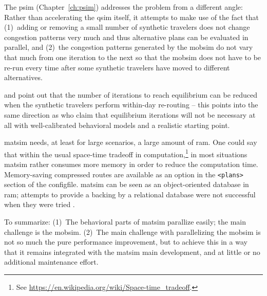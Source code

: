 The \gls{psim} (Chapter~\ref{ch:psim}) addresses the problem from a different angle: Rather than accelerating the \gls{qsim} itself, it attempts to make use of the fact that (1)~adding or removing a small number of synthetic travelers does not change congestion patterns very much and thus alternative plans can be evaluated in parallel, and (2)~the congestion patterns generated by the \gls{mobsim} do not vary that much from one iteration to the next so that the \gls{mobsim} does not have to be re-run every time after some synthetic travelers have moved to different alternatives.

\cite{MaerkiEtAl_Transportation_2014} and \cite{Dobler_PhDThesis_2013} point out that the number of iterations to reach equilibrium can be reduced when the synthetic travelers perform within-day re-routing -- this points into the same direction as \cite{LuEtcBenAkiva2015SimMobility} who claim that equilibrium iterations will not be necessary at all with well-calibrated behavioral models and a realistic starting point.

\gls{matsim} needs, at least for large scenarios, a large amount of \gls{ram}.  One could say that within the usual space-time tradeoff in computation,\footnote{%
%
See \url{https://en.wikipedia.org/wiki/Space-time_tradeoff}.
%
} in most situations \gls{matsim} rather consumes more memory in order to reduce the computation time.  Memory-saving compressed routes are available as an option in the \lstinline{<plans>} section of the \gls{configfile}.  \gls{matsim} can be seen as an object-oriented database in \gls{ram}; attempts to provide a backing by a relational database were not successful when they were tried \citep[][; also see Section~\ref{sec:history-ethz-phase}]{RaneyNagel2004agdb,RaneyNagel2006traf-framework}.



To summarize: (1)~The behavioral parts of \gls{matsim} parallize easily; the main challenge is the \gls{mobsim}.  (2)~The main challenge with parallelizing the \gls{mobsim} is not so much the pure performance improvement, but to achieve this in a way that it remains integrated with the \gls{matsim} main development, and at little or no additional maintenance effort. 



